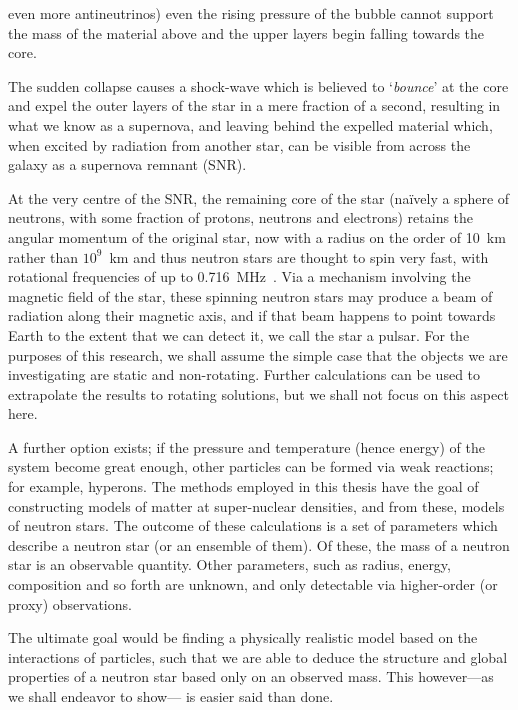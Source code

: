 \documentclass[11pt,a4paper,twoside]{carrollthesis}
\newcommand{\emdash}{\hspace{1pt}---\hspace{1pt}}
\begin{document}
even more antineutrinos) even the rising pressure of the bubble cannot
support the mass of the material above and the upper layers begin
falling towards the core.\par
%
The sudden collapse causes a shock-wave which is believed to
`\emph{bounce}' at the core and expel the outer layers of the star in
a mere fraction of a second, resulting in what we know as a supernova,
and leaving behind the expelled material which, when excited by
radiation from another star, can be visible from across the galaxy as
a supernova remnant (SNR).\par
%
At the very centre of the SNR, the remaining core of the star
(na\"ively a sphere of neutrons, with some fraction of protons,
neutrons and electrons) retains the angular momentum of the original
star, now with a radius on the order of 10~km rather than $10^9$~km
and thus neutron stars are thought to spin very fast, with rotational
frequencies of up to 0.716~MHz~\cite{Hessels:2006ze}. Via a mechanism
involving the magnetic field of the star, these spinning neutron stars
may produce a beam of radiation along their magnetic axis, and if that
beam happens to point towards Earth to the extent that we can detect
it, we call the star a pulsar. For the purposes of this research, we
shall assume the simple case that the objects we are investigating are
static and non-rotating. Further calculations can be used to
extrapolate the results to rotating solutions, but we shall not focus
on this aspect here.\par
%
A further option exists; if the pressure and temperature (hence
energy) of the system become great enough, other particles can be
formed via weak reactions; for example, hyperons. The methods employed
in this thesis have the goal of constructing models of matter at
super-nuclear densities, and from these, models of neutron stars. The
outcome of these calculations is a set of parameters which describe a
neutron star (or an ensemble of them). Of these, the mass of a neutron
star is an observable quantity. Other parameters, such as radius,
energy, composition and so forth are unknown, and only detectable via
higher-order (or proxy) observations.\par
%
The ultimate goal would be finding a physically realistic model based
on the interactions of particles, such that we are able to deduce the
structure and global properties of a neutron star based only on an
observed mass. This however\emdash as we shall endeavor to show\emdash
is easier said than done.\par
%
\end{document}
